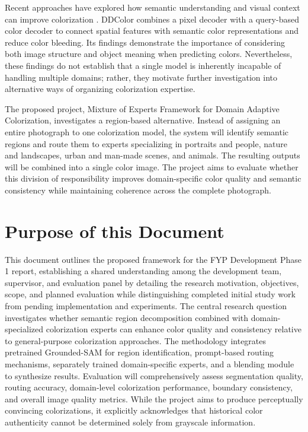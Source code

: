 \documentclass{FastFyp}
\begin{document}
Recent approaches have explored how semantic understanding and visual context can improve colorization \cite{ref2,ref9,ref11}. DDColor \cite{ref9} combines a pixel decoder with a query-based color decoder to connect spatial features with semantic color representations and reduce color bleeding. Its findings demonstrate the importance of considering both image structure and object meaning when predicting colors. Nevertheless, these findings do not establish that a single model is inherently incapable of handling multiple domains; rather, they motivate further investigation into alternative ways of organizing colorization expertise.

The proposed project, Mixture of Experts Framework for Domain Adaptive Colorization, investigates a region-based alternative. Instead of assigning an entire photograph to one colorization model, the system will identify semantic regions and route them to experts specializing in portraits and people, nature and landscapes, urban and man-made scenes, and animals. The resulting outputs will be combined into a single color image. The project aims to evaluate whether this division of responsibility improves domain-specific color quality and semantic consistency while maintaining coherence across the complete photograph.

\section{Purpose of this Document}
This document outlines the proposed framework for the FYP Development Phase 1 report, establishing a shared understanding among the development team, supervisor, and evaluation panel by detailing the research motivation, objectives, scope, and planned evaluation while distinguishing completed initial study work from pending implementation and experiments. The central research question investigates whether semantic region decomposition combined with domain-specialized colorization experts can enhance color quality and consistency relative to general-purpose colorization approaches. The methodology integrates pretrained Grounded-SAM for region identification, prompt-based routing mechanisms, separately trained domain-specific experts, and a blending module to synthesize results. Evaluation will comprehensively assess segmentation quality, routing accuracy, domain-level colorization performance, boundary consistency, and overall image quality metrics. While the project aims to produce perceptually convincing colorizations, it explicitly acknowledges that historical color authenticity cannot be determined solely from grayscale information.
\end{document}
